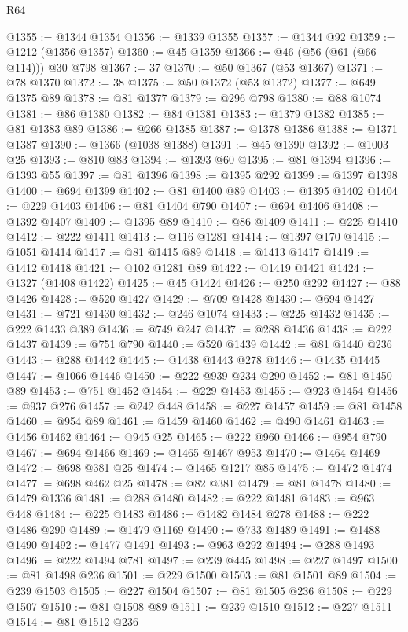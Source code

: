 \begin{lexlean}{R64}
\begin{coremodule}
@1355 := @1344 @1354
@1356 := @1339 @1355
@1357 := @1344 @92
@1359 := @1212 (@1356 @1357)
@1360 := @45 @1359
@1366 := @46 (@56 (@61 (@66 @114))) @30 @798
@1367 := 37
@1370 := @50 @1367 (@53 @1367)
@1371 := @78 @1370
@1372 := 38
@1375 := @50 @1372 (@53 @1372)
@1377 := @649 @1375 @89
@1378 := @81 @1377
@1379 := @296 @798
@1380 := @88 @1074
@1381 := @86 @1380
@1382 := @84 @1381
@1383 := @1379 @1382
@1385 := @81 @1383 @89
@1386 := @266 @1385
@1387 := @1378 @1386
@1388 := @1371 @1387
@1390 := @1366 (@1038 @1388)
@1391 := @45 @1390
@1392 := @1003 @25
@1393 := @810 @83
@1394 := @1393 @60
@1395 := @81 @1394
@1396 := @1393 @55
@1397 := @81 @1396
@1398 := @1395 @292
@1399 := @1397 @1398
@1400 := @694 @1399
@1402 := @81 @1400 @89
@1403 := @1395 @1402
@1404 := @229 @1403
@1406 := @81 @1404 @790
@1407 := @694 @1406
@1408 := @1392 @1407
@1409 := @1395 @89
@1410 := @86 @1409
@1411 := @225 @1410
@1412 := @222 @1411
@1413 := @116 @1281
@1414 := @1397 @170
@1415 := @1051 @1414
@1417 := @81 @1415 @89
@1418 := @1413 @1417
@1419 := @1412 @1418
@1421 := @102 @1281 @89
@1422 := @1419 @1421
@1424 := @1327 (@1408 @1422)
@1425 := @45 @1424
@1426 := @250 @292
@1427 := @88 @1426
@1428 := @520 @1427
@1429 := @709 @1428
@1430 := @694 @1427
@1431 := @721 @1430
@1432 := @246 @1074
@1433 := @225 @1432
@1435 := @222 @1433 @389
@1436 := @749 @247
@1437 := @288 @1436
@1438 := @222 @1437
@1439 := @751 @790
@1440 := @520 @1439
@1442 := @81 @1440 @236
@1443 := @288 @1442
@1445 := @1438 @1443 @278
@1446 := @1435 @1445
@1447 := @1066 @1446
@1450 := @222 @939 @234 @290
@1452 := @81 @1450 @89
@1453 := @751 @1452
@1454 := @229 @1453
@1455 := @923 @1454
@1456 := @937 @276
@1457 := @242 @448
@1458 := @227 @1457
@1459 := @81 @1458
@1460 := @954 @89
@1461 := @1459 @1460
@1462 := @490 @1461
@1463 := @1456 @1462
@1464 := @945 @25
@1465 := @222 @960
@1466 := @954 @790
@1467 := @694 @1466
@1469 := @1465 @1467 @953
@1470 := @1464 @1469
@1472 := @698 @381 @25
@1474 := @1465 @1217 @85
@1475 := @1472 @1474
@1477 := @698 @462 @25
@1478 := @82 @381
@1479 := @81 @1478
@1480 := @1479 @1336
@1481 := @288 @1480
@1482 := @222 @1481
@1483 := @963 @448
@1484 := @225 @1483
@1486 := @1482 @1484 @278
@1488 := @222 @1486 @290
@1489 := @1479 @1169
@1490 := @733 @1489
@1491 := @1488 @1490
@1492 := @1477 @1491
@1493 := @963 @292
@1494 := @288 @1493
@1496 := @222 @1494 @781
@1497 := @239 @445
@1498 := @227 @1497
@1500 := @81 @1498 @236
@1501 := @229 @1500
@1503 := @81 @1501 @89
@1504 := @239 @1503
@1505 := @227 @1504
@1507 := @81 @1505 @236
@1508 := @229 @1507
@1510 := @81 @1508 @89
@1511 := @239 @1510
@1512 := @227 @1511
@1514 := @81 @1512 @236

\end{coremodule}
\end{lexlean}
